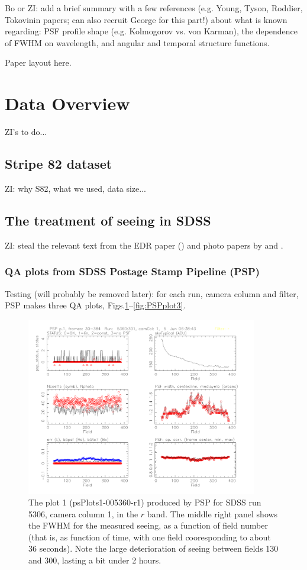 \documentclass[12pt,preprint]{aastex}
\begin{document}
Bo or ZI: add a brief summary with a few references (e.g. Young, Tyson, Roddier,
Tokovinin papers; can also recruit George for this part!) about what is known 
regarding:  PSF profile shape (e.g. Kolmogorov vs. von Karman), 
the dependence of FWHM on wavelength, and angular and temporal 
structure functions. 

Paper layout here.


\section{Data Overview} 

ZI's to do... 

\subsection{Stripe 82 dataset} 

ZI: why S82, what we used, data size...


\subsection{The treatment of seeing in SDSS}

ZI: steal the relevant text from the EDR paper (\citet{SDSSEDR}) and photo papers by \cite{Lupton2001} 
and \cite{Lupton2002}. 


\subsubsection{QA plots from SDSS Postage Stamp Pipeline (PSP)}

Testing (will probably be removed later): for each run, camera column and filter, PSP makes three QA plots, 
Figs.\ref{fig:PSPplot1}--\ref{fig:PSPplot3}. 


\begin{figure}
\centering
\includegraphics[width=0.9\textwidth]{FIGURES/psPlots1-005360-r1.pdf}
\caption{The plot 1 (psPlots1-005360-r1) produced by PSP for SDSS run 5306, 
camera column 1, in the $r$ band. The middle right panel shows the FWHM for
the measured seeing, as a function of field number (that is, as  function of time, 
with one field cooresponding to about 36 seconds). Note the large deterioration
of seeing between fields 130 and 300, lasting a bit under 2 hours. 
\label{fig:PSPplot1}}
\end{figure}
\end{document}
